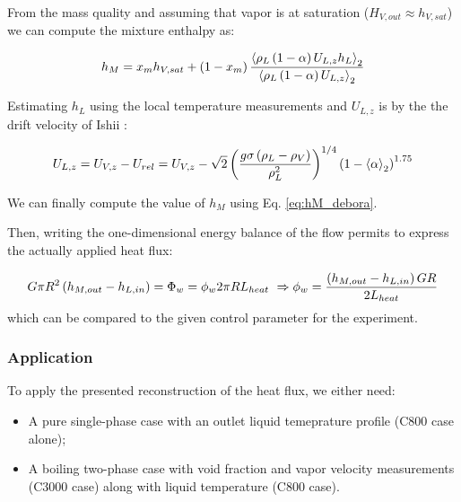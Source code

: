 \npar

From the mass quality and assuming that vapor is at saturation ($H_{V,out}\approx h_{V,sat}$) we can compute the mixture enthalpy as:

\begin{equation}
h_{M} = x_{m} h_{V,sat} + \left( 1-x_{m} \right) \frac{\left< \rho_{L}\left( 1-\alpha \right)U_{L,z}h_{L} \right>_{2}}{\left< \rho_{L}\left( 1-\alpha \right)U_{L,z} \right>_{2}}
\label{eq:hM_debora}
\end{equation}

%

Estimating $h_{L}$ using the local temperature measurements and $U_{L,z}$ is by the the drift velocity of Ishii \cite{ishii_one-dimensional_1977}:

\begin{equation}
U_{L,z} = U_{V,z} - U_{rel} = U_{V,z} - \sqrt{2} \left( \frac{g \sigma \left( \rho_{L}-\rho_{V} \right)}{\rho_{L}^{2}} \right)^{1/4} \left( 1-\left< \alpha \right>_{2} \right)^{1.75}
\label{eq:drift_debora}
\end{equation}

We can finally compute the value of $h_{M}$ using Eq. \ref{eq:hM_debora}.
\npar

Then, writing the one-dimensional energy balance of the flow permits to express the actually applied heat flux: 

\begin{equation}
G \pi R^{2} \left( h_{M,out} - h_{L,in} \right) = \Phi_{w} = \phi_{w} 2\pi R L_{heat} \ \Rightarrow \phi_{w} = \frac{\left( h_{M,out}-h_{L,in} \right)GR}{2L_{heat}}
\end{equation}
which can be compared to the given control parameter for the experiment.

\subsubsection{Application}

To apply the presented reconstruction of the heat flux, we either need: 

\begin{itemize}
\item A pure single-phase case with an outlet liquid temeprature profile (C800 case alone);
\item A boiling two-phase case with void fraction and vapor velocity measurements (C3000 case) along with liquid temperature (C800 case).
\end{itemize}

